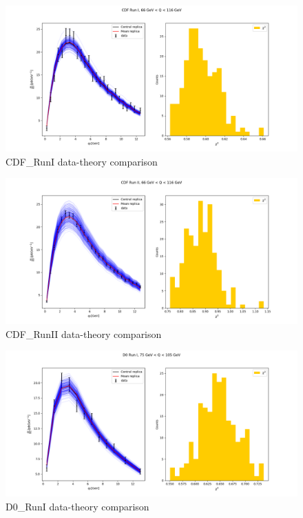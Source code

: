 \documentclass[
]{article}
\begin{document}
\begin{figure}
\centering
\includegraphics{pngplots/CDF_RunI.png}
\caption{CDF\_RunI data-theory comparison}
\end{figure}

\begin{figure}
\centering
\includegraphics{pngplots/CDF_RunII.png}
\caption{CDF\_RunII data-theory comparison}
\end{figure}

\begin{figure}
\centering
\includegraphics{pngplots/D0_RunI.png}
\caption{D0\_RunI data-theory comparison}
\end{figure}
\end{document}
